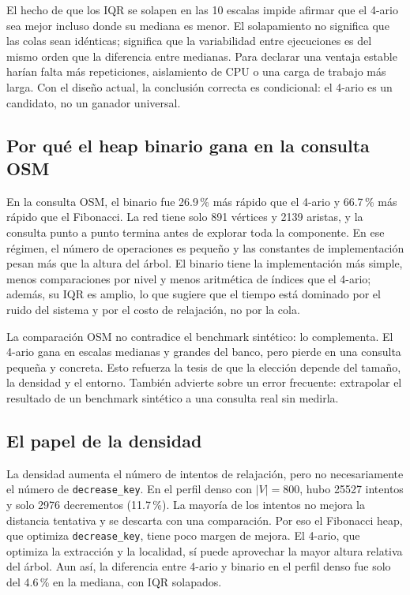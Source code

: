 El hecho de que los IQR se solapen en las 10 escalas impide afirmar que el 4-ario sea mejor incluso donde su mediana es menor. El solapamiento no significa que las colas sean idénticas; significa que la variabilidad entre ejecuciones es del mismo orden que la diferencia entre medianas. Para declarar una ventaja estable harían falta más repeticiones, aislamiento de CPU o una carga de trabajo más larga. Con el diseño actual, la conclusión correcta es condicional: el 4-ario es un candidato, no un ganador universal.

\subsection{Por qué el heap binario gana en la consulta OSM}
En la consulta OSM, el binario fue 26.9\,\% más rápido que el 4-ario y 66.7\,\% más rápido que el Fibonacci. La red tiene solo 891 vértices y 2139 aristas, y la consulta punto a punto termina antes de explorar toda la componente. En ese régimen, el número de operaciones es pequeño y las constantes de implementación pesan más que la altura del árbol. El binario tiene la implementación más simple, menos comparaciones por nivel y menos aritmética de índices que el 4-ario; además, su IQR es amplio, lo que sugiere que el tiempo está dominado por el ruido del sistema y por el costo de relajación, no por la cola.

La comparación OSM no contradice el benchmark sintético: lo complementa. El 4-ario gana en escalas medianas y grandes del banco, pero pierde en una consulta pequeña y concreta. Esto refuerza la tesis de que la elección depende del tamaño, la densidad y el entorno. También advierte sobre un error frecuente: extrapolar el resultado de un benchmark sintético a una consulta real sin medirla.

\subsection{El papel de la densidad}
La densidad aumenta el número de intentos de relajación, pero no necesariamente el número de \texttt{decrease\_key}. En el perfil denso con $|V|=800$, hubo 25527 intentos y solo 2976 decrementos (11.7\,\%). La mayoría de los intentos no mejora la distancia tentativa y se descarta con una comparación. Por eso el Fibonacci heap, que optimiza \texttt{decrease\_key}, tiene poco margen de mejora. El 4-ario, que optimiza la extracción y la localidad, sí puede aprovechar la mayor altura relativa del árbol. Aun así, la diferencia entre 4-ario y binario en el perfil denso fue solo del 4.6\,\% en la mediana, con IQR solapados.


